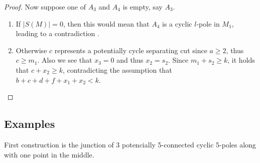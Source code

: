 \documentclass[12pt, twoside]{book}
\begin{document}
\begin{proof}
	Now suppose one of $A_3$ and $A_4$ is empty, say $A_3$.
	
	\begin{enumerate}
		\item If $|S(M)|=0$, then this would mean that $A_4$ is a cyclic $l$-pole in $M_1$, leading to a contradiction .
		\item Otherwise $c$ represents a potentially cycle separating cut since $a\geq 2$, thus $c\geq m_1$. Also we see that $x_3=0$ and thus $x_2=s_2$. Since $m_1+s_2\geq k$, it holds that $c+x_2\geq k$, contradicting the assumption that $b+c+d+f+x_1+x_2<k$.
	\end{enumerate}
\end{proof}

\subsection{Examples}

First construction is the junction of 3 potencially 5-connected cyclic 5-poles along with one point in the middle.
\end{document}

